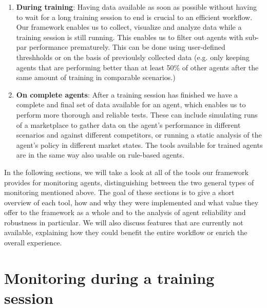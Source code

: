 \begin{enumerate}
	\item \textbf{During training}: Having data available as soon as possible without having to wait for a long training session to end is crucial to an efficient workflow. Our framework enables us to collect, visualize and analyze data while a training session is still running. This enables us to filter out agents with sub-par performance prematurely. This can be done using user-defined threshholds or on the basis of previoulsly collected data (e.g. only keeping agents that are performing better than at least 50\% of other agents after the same amount of training in comparable scenarios.) 

	\item \textbf{On complete agents}: After a training session has finished we have a complete and final set of data available for an agent, which enables us to perform more thorough and reliable tests. These can include simulating runs of a marketplace to gather data on the agent's performance in different scenarios and against different competitors, or running a static analysis of the agent's policy in different market states. The tools available for trained agents are in the same way also usable on rule-based agents.
\end{enumerate}

In the following sections, we will take a look at all of the tools our framework provides for monitoring agents, distinguishing between the two general types of monitoring mentioned above. The goal of these sections is to give a short overview of each tool, how and why they were implemented and what value they offer to the framework as a whole and to the analysis of agent reliability and robustness in particular. We will also discuss features that are currently not available, explaining how they could benefit the entire workflow or enrich the overall experience.

\section{Monitoring during a training session}

